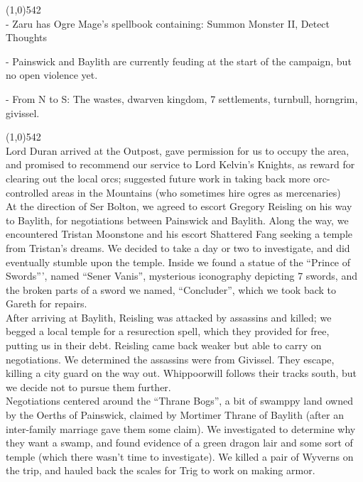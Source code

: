 \documentclass[letterpaper]{article}
\newcommand{\fullline}{\noindent\line(1,0){542} \\}
\begin{document}
\vspace{-1.75em}
\fullline
\noindent - Zaru has Ogre Mage's spellbook containing: Summon Monster II, Detect Thoughts

\noindent - Painswick and Baylith are currently feuding at the start of the campaign, but no open violence yet.

\noindent - From N to S: The wastes, dwarven kingdom, 7 settlements, turnbull, horngrim, givissel.

\vspace{-0.75em}
\fullline
\noindent Lord Duran arrived at the Outpost, gave permission for us to occupy the area, and promised to recommend our service to Lord Kelvin's Knights, as reward for clearing out the local orcs; suggested future work in taking back more orc-controlled areas in the Mountains (who sometimes hire ogres as mercenaries)\\

\noindent At the direction of Ser Bolton, we agreed to escort Gregory Reisling on his way to Baylith, for negotiations between Painswick and Baylith.  Along the way, we encountered Tristan Moonstone and his escort Shattered Fang seeking a temple from Tristan's dreams. We decided to take a day or two to investigate, and did eventually stumble upon the temple.  Inside we found a statue of the ``Prince of Swords''', named ``Sener Vanis'', mysterious iconography depicting 7 swords, and the broken parts of a sword we named, ``Concluder'', which we took back to Gareth for repairs.\\

\noindent After arriving at Baylith, Reisling was attacked by assassins and killed; we begged a local temple for a resurection spell, which they provided for free, putting us in their debt.  Reisling came back weaker but able to carry on negotiations.  We determined the assassins were from Givissel.  They escape, killing a city guard on the way out.  Whippoorwill follows their tracks south, but we decide not to pursue them further.\\

\noindent Negotiations centered around the ``Thrane Bogs'', a bit of swamppy land owned by the Oerths of Painswick, claimed by Mortimer Thrane of Baylith (after an inter-family marriage gave them some claim).  We investigated to determine why they want a swamp, and found evidence of a green dragon lair and some sort of temple (which there wasn't time to investigate).  We killed a pair of Wyverns on the trip, and hauled back the scales for Trig to work on making armor.\\
\end{document}
